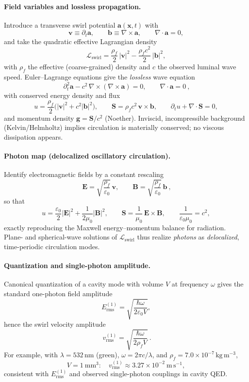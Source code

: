 \documentclass[11pt]{article}
\begin{document}
    \paragraph{Field variables and lossless propagation.}
    Introduce a transverse swirl potential $\mathbf{a}(\mathbf{x},t)$ with
    \[
    \mathbf{v} \equiv \partial_t \mathbf{a},\qquad
    \mathbf{b} \equiv \nabla\times \mathbf{a},\qquad \nabla\cdot \mathbf{a}=0,
    \]
    and take the quadratic effective Lagrangian density
    \[
    \mathcal{L}_\text{swirl}
    =\frac{\rho_f}{2}\,|\mathbf{v}|^2-\frac{\rho_f c^2}{2}\,|\mathbf{b}|^2,
    \]
    with $\rho_f$ the effective (coarse-grained) density and $c$ the observed luminal wave speed.
    Euler–Lagrange equations give the \emph{lossless} wave equation
    \[
    \boxed{\ \partial_t^2 \mathbf{a}-c^2\,\nabla\times(\nabla\times \mathbf{a})=0,\qquad \nabla\cdot \mathbf{a}=0\ },
    \]
    with conserved energy density and flux
    \[
    u=\frac{\rho_f}{2}\Big(|\mathbf{v}|^2+c^2|\mathbf{b}|^2\Big),\qquad
    \mathbf{S}=\rho_f c^2\,\mathbf{v}\times \mathbf{b},\qquad
    \partial_t u+\nabla\cdot \mathbf{S}=0,
    \]
    and momentum density $\mathbf{g}=\mathbf{S}/c^2$ (Noether).
    Inviscid, incompressible background (Kelvin/Helmholtz) implies circulation is materially conserved; no viscous dissipation appears.~\cite{Batchelor1967,Saffman1992}

    \paragraph{Photon map (delocalized oscillatory circulation).}
    Identify electromagnetic fields by a constant rescaling
    \[
    \boxed{\ \mathbf{E}=\sqrt{\frac{\rho_f}{\varepsilon_0}}\,\mathbf{v},\qquad
    \mathbf{B}=\sqrt{\frac{\rho_f}{\varepsilon_0}}\,\mathbf{b}\ },
    \]
    so that
    \[
    u=\frac{\varepsilon_0}{2}|\mathbf{E}|^2+\frac{1}{2\mu_0}|\mathbf{B}|^2,\qquad
    \mathbf{S}=\frac{1}{\mu_0}\,\mathbf{E}\times \mathbf{B},\qquad
    \frac{1}{\varepsilon_0\mu_0}=c^2,
    \]
    exactly reproducing the Maxwell energy–momentum balance for radiation.~\cite{Jackson1999}
    Plane- and spherical-wave solutions of $\mathcal{L}_\text{swirl}$ thus realize \emph{photons} as \emph{delocalized}, time-periodic circulation modes.

    \paragraph{Quantization and single-photon amplitude.}
    Canonical quantization of a cavity mode with volume $V$ at frequency $\omega$ gives the standard one-photon field amplitude
    \[
    E_{\mathrm{rms}}^{(1)}=\sqrt{\frac{\hbar\omega}{2\varepsilon_0 V}},
    \]
    hence the swirl velocity amplitude
    \[
    \boxed{\ v_{\mathrm{rms}}^{(1)}=\sqrt{\frac{\hbar\omega}{2\rho_f V}}\ }.
    \]
    For example, with $\lambda=532\,\mathrm{nm}$ (green), $\omega=2\pi c/\lambda$, and $\rho_f=7.0\times 10^{-7}\,\mathrm{kg\,m^{-3}}$,
    \[
    V=1~\mathrm{mm}^3:\quad v_{\mathrm{rms}}^{(1)}\approx 3.27\times 10^{-2}\ \mathrm{m\,s^{-1}},
    \]
    consistent with $E_{\mathrm{rms}}^{(1)}$ and observed single-photon couplings in cavity QED.~\cite{HarocheRaimond2006,ScullyZubairy1997}
\end{document}
